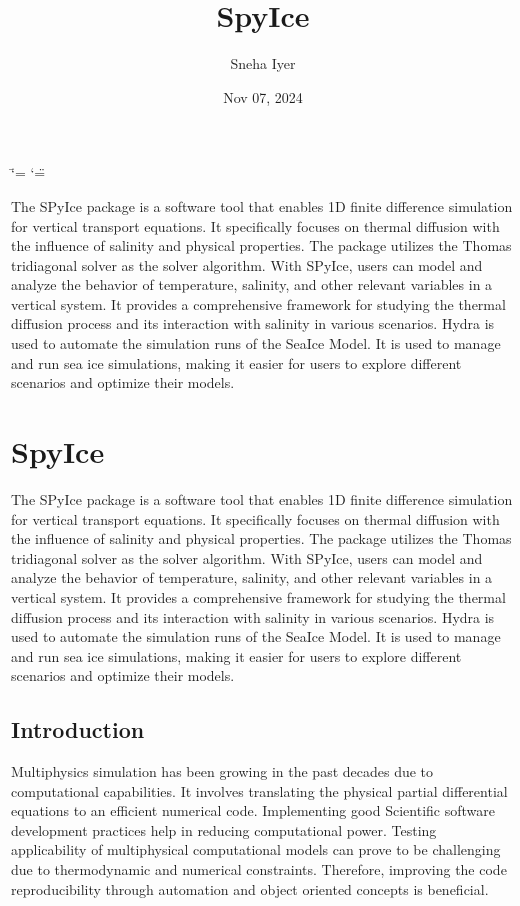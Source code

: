 \documentclass[a4paper,11pt,english,openany]{sphinxmanual}
\title{SpyIce}
\date{Nov 07, 2024}
\author{Sneha Iyer}
\begin{document}
\ifdefined\shorthandoff
  \ifnum\catcode`\=\string=\active\shorthandoff{=}\fi
  \ifnum\catcode`\"=\active{}\fi
\fi

\pagestyle{empty}
\sphinxmaketitle
\pagestyle{plain}
\sphinxtableofcontents
\pagestyle{normal}
\label{\detokenize{index::doc}}


\sphinxAtStartPar
The SPyIce package is a software tool that enables 1D finite difference simulation for vertical transport equations. It specifically focuses on thermal diffusion with the influence of salinity and physical properties. The package utilizes the Thomas tridiagonal solver as the solver algorithm. With SPyIce, users can model and analyze the behavior of temperature, salinity, and other relevant variables in a vertical system. It provides a comprehensive framework for studying the thermal diffusion process and its interaction with salinity in various scenarios. Hydra is used to automate the simulation runs of the Sea\sphinxhyphen{}Ice Model. It is used to manage and run sea ice simulations, making it easier for users to explore different scenarios and optimize their models.

\sphinxstepscope


\chapter{SpyIce}
\label{\detokenize{report/_index:spyice}}\label{\detokenize{report/_index::doc}}
\sphinxAtStartPar
The SPyIce package is a software tool that enables 1D finite difference simulation for vertical transport equations. It specifically focuses on thermal diffusion with the influence of salinity and physical properties. The package utilizes the Thomas tridiagonal solver as the solver algorithm. With SPyIce, users can model and analyze the behavior of temperature, salinity, and other relevant variables in a vertical system. It provides a comprehensive framework for studying the thermal diffusion process and its interaction with salinity in various scenarios. Hydra is used to automate the simulation runs of the Sea\sphinxhyphen{}Ice Model. It is used to manage and run sea ice simulations, making it easier for users to explore different scenarios and optimize their models.

\sphinxstepscope


\section{Introduction}
\label{\detokenize{report/introduction:introduction}}\label{\detokenize{report/introduction::doc}}
\sphinxAtStartPar
Multiphysics simulation has been growing in the past decades due to computational capabilities. It involves translating the
physical partial differential equations to an efficient numerical code. Implementing good Scientific software development
practices help in reducing computational power. Testing applicability of multiphysical computational models can prove to be
challenging due to thermodynamic and numerical constraints. Therefore, improving the code reproducibility through
automation and object oriented concepts is beneficial.
\end{document}
